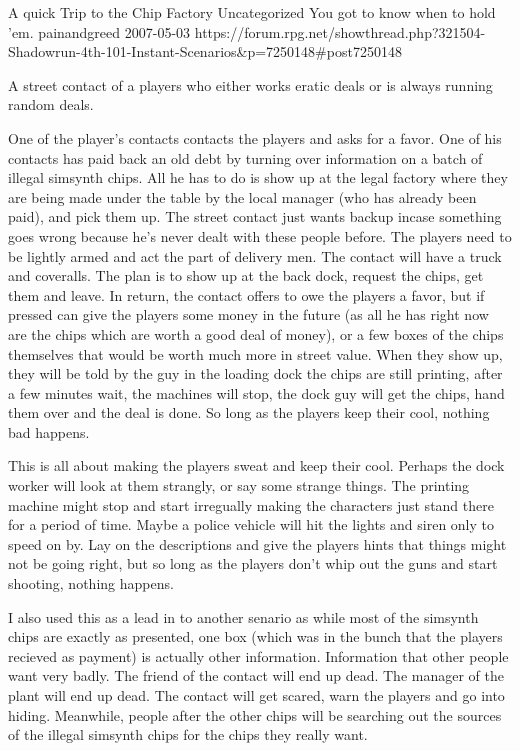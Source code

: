 \begin{scenario}{A quick Trip to the Chip Factory}
	{Uncategorized}
	{You got to know when to hold 'em.}
	{painandgreed}
	{2007-05-03}
	{https://forum.rpg.net/showthread.php?321504-Shadowrun-4th-101-Instant-Scenarios\&p=7250148#post7250148}

 A street contact of a players who either works eratic deals or is always running random deals.

\synopsis  One of the player's contacts contacts the players and asks for a favor. One of his contacts has paid back an old debt by turning over information on a batch of illegal simsynth chips. All he has to do is show up at the legal factory where they are being made under the table by the local manager (who has already been paid), and pick them up. The street contact just wants backup incase something goes wrong because he's never dealt with these people before. The players need to be lightly armed and act the part of delivery men. The contact will have a truck and coveralls. The plan is to show up at the back dock, request the chips, get them and leave. In return, the contact offers to owe the players a favor, but if pressed can give the players some money in the future (as all he has right now are the chips which are worth a good deal of money), or a few boxes of the chips themselves that would be worth much more in street value. When they show up, they will be told by the guy in the loading dock the chips are still printing, after a few minutes wait, the machines will stop, the dock guy will get the chips, hand them over and the deal is done. So long as the players keep their cool, nothing bad happens. 

\notes  This is all about making the players sweat and keep their cool. Perhaps the dock worker will look at them strangly, or say some strange things. The printing machine might stop and start irregually making the characters just stand there for a period of time. Maybe a police vehicle will hit the lights and siren only to speed on by. Lay on the descriptions and give the players hints that things might not be going right, but so long as the players don't whip out the guns and start shooting, nothing happens.

I also used this as a lead in to another senario as while most of the simsynth chips are exactly as presented, one box (which was in the bunch that the players recieved as payment) is actually other information. Information that other people want very badly. The friend of the contact will end up dead. The manager of the plant will end up dead. The contact will get scared, warn the players and go into hiding. Meanwhile, people after the other chips will be searching out the sources of the illegal simsynth chips for the chips they really want. 

\end{scenario}